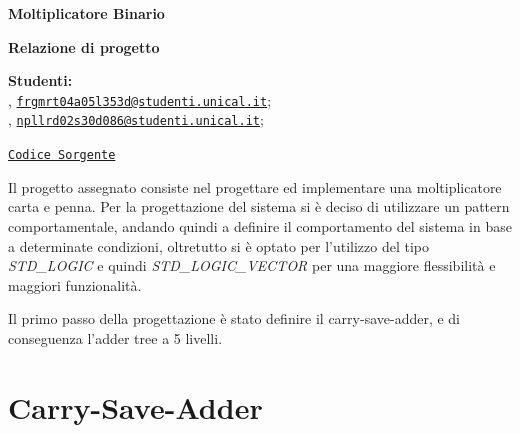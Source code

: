 



\usepackage{placeins}
\usepackage{listings}
\usepackage{xcolor}





\begin{Large}
    \textsf{\textbf{Moltiplicatore Binario}}\\
\end{Large}
\textbf{Relazione di progetto}

\vspace{1ex}

\textsf{\textbf{Studenti:}} \\
, \href{frgmrt04a05l353d@studenti.unical.it}{\texttt{frgmrt04a05l353d@studenti.unical.it}};\\
, \href{npllrd02s30d086@studenti.unical.it} {\texttt{npllrd02s30d086@studenti.unical.it}};

\href{https://github.com/Zi0LEO/elettronica_digitale}{\texttt{Codice Sorgente}}


\vspace{2ex}

Il progetto assegnato consiste nel progettare ed implementare una moltiplicatore carta e penna.
Per la progettazione del sistema si è deciso di utilizzare un pattern comportamentale, andando quindi a definire il comportamento del sistema in base a determinate condizioni, oltretutto si è optato per l'utilizzo del tipo \textit{STD\_LOGIC} e quindi \textit{STD\_LOGIC\_VECTOR} per una maggiore flessibilità e maggiori funzionalità.

Il primo passo della progettazione è stato definire il carry-save-adder, e di conseguenza l'adder tree a 5 livelli.
\section{Carry-Save-Adder}
